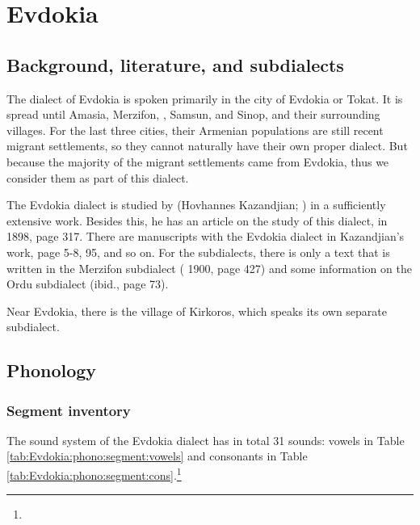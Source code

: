 \chapter{Evdokia} \label{chapter:Evdokia}
\section{Background, literature, and subdialects}

\begin{adjarianpage}\label{page:232}\end{adjarianpage}%

The dialect of Evdokia is spoken primarily in the city of Evdokia or Tokat. It is spread until Amasia, Merzifon, , Samsun, and Sinop, and their surrounding villages. For the last three cities, their Armenian populations are still recent migrant settlements, so they cannot naturally have their own proper dialect. But because the majority of the migrant settlements came from Evdokia, thus we consider them as part of this dialect. 



The Evdokia dialect is studied by \citet{KazandjianBook} (Hovhannes Kazandjian;  ) in a sufficiently extensive work. Besides this, he has an article on the study of this dialect, in  1898, page 317. There are manuscripts with the Evdokia dialect in Kazandjian's work, page 5-8, 95, and so on. For the subdialects, there is only a text that is written in the Merzifon subdialect ( 1900, page 427) and some information on the Ordu subdialect (ibid., page 73). 

Near Evdokia, there is the village of Kirkoros, which speaks its own separate subdialect. 


\section{Phonology}

\subsection{Segment inventory}

The sound system of the Evdokia dialect has in total 31 sounds: vowels in Table \ref{tab:Evdokia:phono:segment:vowels} and consonants in Table \ref{tab:Evdokia:phono:segment:cons}.\footnote{}




